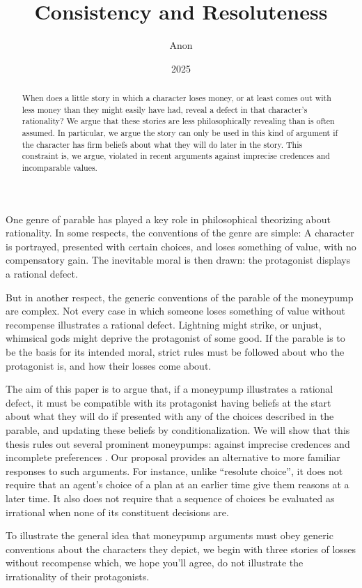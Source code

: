 \documentclass[
  11pt,
  letterpaper]{article}
\title{Consistency and Resoluteness}
\author{Anon}
\date{2025}
\begin{document}
\maketitle
\begin{abstract}
When does a little story in which a character loses money, or at least comes out with less money than they might easily have had, reveal a defect in that character's rationality? We argue that these stories are less philosophically revealing than is often assumed. In particular, we argue the story can only be used in this kind of argument if the character has firm beliefs about what they will do later in the story. This constraint is, we argue, violated in recent arguments against imprecise credences and incomparable values.
\end{abstract}

One genre of parable has played a key role in philosophical theorizing about rationality. In some respects, the conventions of the genre are simple: A character is portrayed, presented with certain choices, and loses something of value, with no compensatory gain. The inevitable moral is then drawn: the protagonist displays a rational defect.

But in another respect, the generic conventions of the parable of the moneypump are complex. Not every case in which someone loses something of value without recompense illustrates a rational defect. Lightning might strike, or unjust, whimsical gods might deprive the protagonist of some good. If the parable is to be the basis for its intended moral, strict rules must be followed about who the protagonist is, and how their losses come about. 

The aim of this paper is to argue that, if a moneypump illustrates a rational defect, it must be compatible with its protagonist having beliefs at the start about what they will do if presented with any of the choices described in the parable, and updating these beliefs by conditionalization. We will show that this thesis rules out several prominent moneypumps: against imprecise credences \citep{Elga2010} and incomplete preferences \citep{Gustafsson2022, Gustafsson2025}. Our proposal provides an alternative to more familiar responses to such arguments. For instance, unlike ``resolute choice'', it does not require that an agent's choice of a plan at an earlier time give them reasons at a later time. It also does not require that a sequence of choices be evaluated as irrational when none of its constituent decisions are.

To illustrate the general idea that moneypump arguments must obey generic conventions about the characters they depict, we begin with three stories of losses without recompense which, we hope you'll agree, do not illustrate the irrationality of their protagonists.
\end{document}
